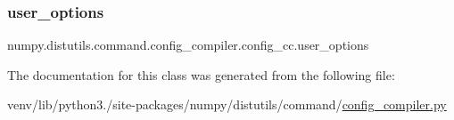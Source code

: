\subsubsection{\texorpdfstring{user\+\_\+options}{user\_options}}
{\footnotesize\ttfamily numpy.\+distutils.\+command.\+config\+\_\+compiler.\+config\+\_\+cc.\+user\+\_\+options\hspace{0.3cm}{\ttfamily [static]}}



The documentation for this class was generated from the following file\+:\begin{DoxyCompactItemize}
\item 
venv/lib/python3./site-\/packages/numpy/distutils/command/\hyperlink{config__compiler_8py}{config\+\_\+compiler.\+py}\end{DoxyCompactItemize}
